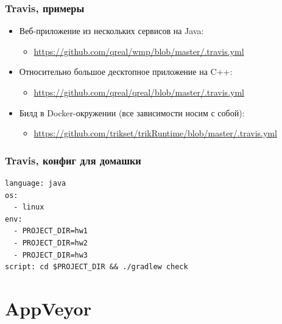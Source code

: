 \documentclass[xetex,mathserif,serif]{beamer}
\begin{document}
	\begin{frame}
		\frametitle{Travis, примеры}
		\begin{itemize}
			\item Веб-приложение из нескольких сервисов на Java:
			\begin{itemize}
				\item \url{https://github.com/qreal/wmp/blob/master/.travis.yml}
			\end{itemize}
			\item Относительно большое десктопное приложение на C++:
			\begin{itemize}
				\item \url{https://github.com/qreal/qreal/blob/master/.travis.yml}
			\end{itemize}
			\item Билд в Docker-окружении (все зависимости носим с собой):
			\begin{itemize}
				\item \url{https://github.com/trikset/trikRuntime/blob/master/.travis.yml}
			\end{itemize}
		\end{itemize}
	\end{frame}

	\begin{frame}[fragile]
		\frametitle{Travis, конфиг для домашки}
		\begin{verbatim}
language: java
os:
  - linux
env:
  - PROJECT_DIR=hw1
  - PROJECT_DIR=hw2
  - PROJECT_DIR=hw3
script: cd $PROJECT_DIR && ./gradlew check
		\end{verbatim}
	\end{frame}

	\section{AppVeyor}
\end{document}
